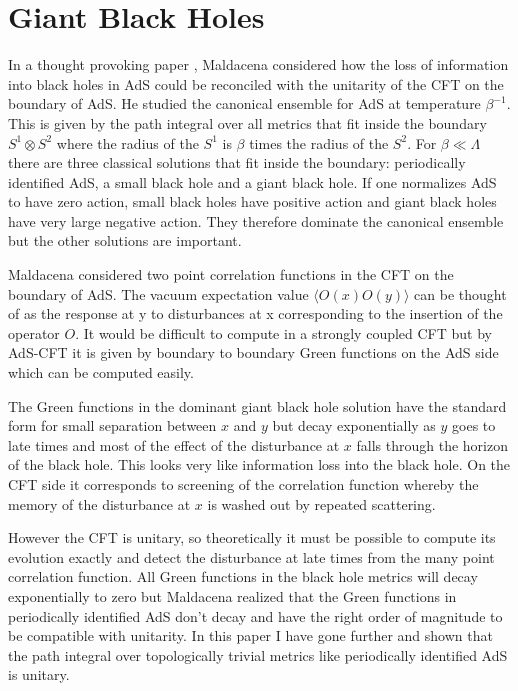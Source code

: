 \documentclass[aps,prd,groupedaddress,showpacs,12pt,nofootinbib]{revtex4-1}
\begin{document}
\section{Giant Black Holes }

In a thought provoking paper \cite{Maldacena1}, Maldacena considered how the loss of information into black holes in AdS could be reconciled with the unitarity of the CFT on the boundary of AdS. He studied the canonical ensemble for AdS at temperature $\beta^{-1}$. This is given by the path integral over all metrics that fit inside the boundary $S^1\otimes S^2$ where the radius of the $S^1$ is $\beta$ times the radius of the $S^2$. For $\beta \ll  \Lambda$ there are three classical solutions that fit inside the boundary: periodically identified AdS, a small black hole and a giant black hole. If one normalizes AdS to have zero action, small black holes have positive action and giant black holes have very large negative action. They therefore dominate the canonical ensemble but the other solutions are important. 

Maldacena considered two point correlation functions in the CFT on the boundary of AdS. The vacuum expectation value $\langle O(x) O (y)\rangle$ can be thought of as the response at y to disturbances at x corresponding to the insertion of the operator $O$.  It would be difficult to compute in a strongly coupled CFT but by AdS-CFT it is given by boundary to boundary Green functions on the AdS side which can be computed easily. 

The Green functions in the dominant giant black hole solution have the standard form for small separation between $x$ and $y$ but decay exponentially as $y$ goes to late times and most of the effect of the disturbance at $x$ falls through the horizon of the black hole. This looks very like information loss into the black hole. On the CFT side it corresponds to screening of the correlation function whereby the memory of the disturbance at $x$ is washed out by repeated scattering. 

However the CFT is unitary, so theoretically it must be possible to compute its evolution exactly and detect the disturbance at late times from the many point correlation function. All Green functions in the black hole metrics will decay exponentially to zero but Maldacena realized that the Green functions in periodically identified AdS don't decay and have the right order of magnitude to be compatible with unitarity. In this paper I have gone further and shown that the path integral over topologically trivial metrics like periodically identified AdS is unitary.  
\end{document}
